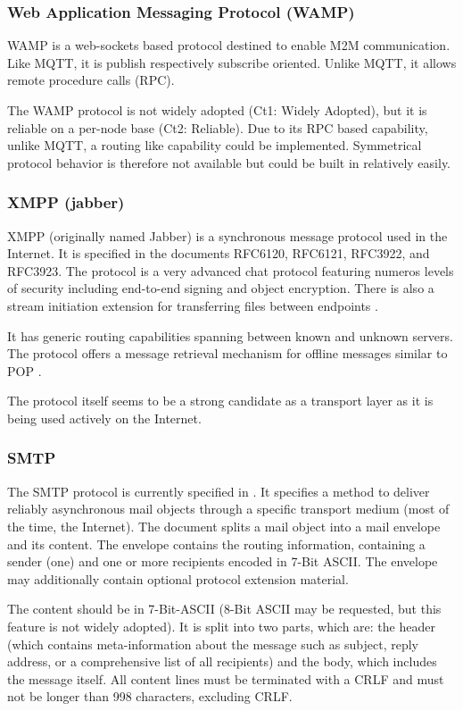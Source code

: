 \subsubsection*{Web Application Messaging Protocol (WAMP)}
WAMP is a web-sockets based protocol destined to enable M2M communication. Like MQTT, it is publish respectively subscribe oriented. Unlike MQTT, it allows remote procedure calls (RPC).

The WAMP protocol is not widely adopted (Ct1: Widely Adopted), but it is reliable on a per-node base (Ct2: Reliable). Due to its RPC based capability, unlike MQTT, a routing like capability could be implemented. Symmetrical protocol behavior is therefore not available but could be built in relatively easily.

\subsubsection*{XMPP (jabber)}
XMPP (originally named Jabber) is a synchronous message protocol used in the Internet. It is specified in the documents RFC6120\cite{rfc6120}, RFC6121\cite{rfc6121}, RFC3922\cite{rfc3922}, and RFC3923\cite{rfc3923}. The protocol is a very advanced chat protocol featuring numeros levels of security including end-to-end signing and object encryption\cite{rfc3923}. There is also a stream initiation extension for transferring files between endpoints \cite{xep0096}.

It has generic routing capabilities spanning between known and unknown servers. The protocol offers a message retrieval mechanism for offline messages similar to POP \cite{xep0013}.

The protocol itself seems to be a strong candidate as a transport layer as it is being used actively on the Internet.

\subsubsection*{SMTP}
The SMTP protocol is currently specified in \cite{rfc5321}. It specifies a method to deliver reliably asynchronous mail objects through a specific transport medium (most of the time, the Internet). The document splits a mail object into a mail envelope and its content. The envelope contains the routing information, containing a sender (one) and one or more recipients encoded in 7-Bit ASCII. The envelope may additionally contain optional protocol extension material. 

The content should be in 7-Bit-ASCII (8-Bit ASCII may be requested, but this feature is not widely adopted). It is split into two parts, which are: the header (which contains meta-information about the message such as subject, reply address, or a comprehensive list of all recipients) and the body, which includes the message itself. All content lines must be terminated with a CRLF and must not be longer than 998 characters, excluding CRLF.


